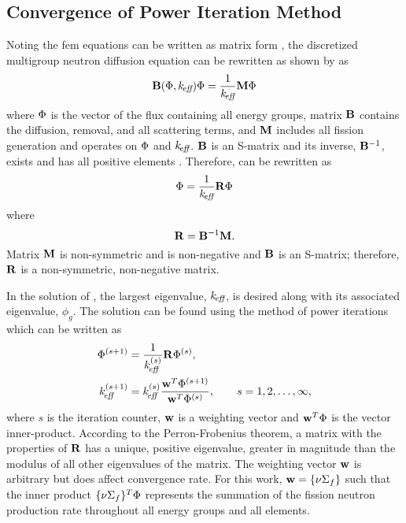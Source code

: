   \subsection{Convergence of Power Iteration Method}
    Noting the \gls{fem} equations can be written as matrix form
    , the discretized multigroup neutron diffusion 
    equation can be rewritten as shown by \textcite{gehinThesis} as
    \begin{equation}
      \label{eq:gehin_notation}
      \mathbf{B}(\Phi,k_{\!\mbox{\scriptsize \em eff}}) \Phi = \frac{1}{k_{\!\mbox{\scriptsize \em eff}}} \mathbf{M} \Phi
    \end{equation}
    where $\Phi$ is the vector of the flux containing all energy groups, matrix 
    $\mathbf{B}$ contains the diffusion, removal, and all scattering terms, and $\mathbf{M}$ 
    includes all fission generation and operates on $\Phi$ and $k_{\!\mbox{\scriptsize \em eff}}$. $\mathbf{B}$
    is an S-matrix and its inverse, $\mathbf{B}^{-1}$, exists and has all positive 
    elements \cite{nakamura}. Therefore,  can be 
    rewritten as
    \begin{equation}
      \label{eq:gehin_solution}
      \Phi = \frac{1}{k_{\!\mbox{\scriptsize \em eff}}} \mathbf{R} \Phi
    \end{equation}
    where
    \begin{equation}
      \label{eq:gehin_r}
      \mathbf{R} = \mathbf{B}^{-1} \mathbf{M}.
    \end{equation}
    Matrix $\mathbf{M}$ is non-symmetric and is non-negative and $\mathbf{B}$ is an S-matrix;
    therefore, $\mathbf{R}$ is a non-symmetric, non-negative matrix.

    In the solution of , the largest eigenvalue,
    $k_{\!\mbox{\scriptsize \em eff}}$, is desired along with its associated eigenvalue, $\phi_g$. The
    solution can be found using the method of power iterations which can be
    written as 
    \begin{align}
      \label{eq:power_iteration_phi}
      \Phi^{(s+1)} &= \frac{1}{k_{\!\mbox{\scriptsize \em eff}}^{(s)}} \mathbf{R} \Phi^{(s)}, \\
      \label{eq:power_iteration_eigenvalue}
      k_{\!\mbox{\scriptsize \em eff}}^{(s+1)} &= k_{\!\mbox{\scriptsize \em eff}}^{(s)} \frac{\mathbf{w}^{T} \Phi^{(s+1)}}
        {\mathbf{w}^{T} \Phi^{(s)}}, \qquad s = 1,2,\ldots,\infty,
    \end{align}
    where $s$ is the iteration counter, $\mathbf{w}$ is a weighting vector and 
    $\mathbf{w}^{T} \Phi$ is the vector inner-product. According to the 
    Perron-Frobenius theorem, a matrix with the properties of $\mathbf{R}$ has a 
    unique, positive eigenvalue, greater in magnitude than the modulus of all 
    other eigenvalues of the matrix. The weighting vector $\mathbf{w}$ is arbitrary 
    but does affect convergence rate. For this work,
    $\mathbf{w} = \{\nu \Sigma_f\}$ such that the inner product 
    $\{\nu \Sigma_f\}^T \Phi$ represents the summation of the fission neutron
    production rate throughout all energy groups and all elements. 
    

